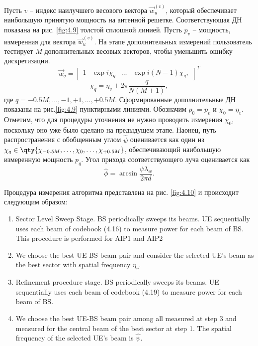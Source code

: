 Пусть $v$ -- индекс наилучшего весового вектора $\vec w_u^{(v)}$, который
обеспечивает наибольшую принятую мощность на антенной решетке.  Соответствующая
ДН показана на рис. \ref{fig:4.9} толстой сплошной линией. Пусть $p_v$ --
мощность, измеренная для вектора $\vec w_u^{(v)}$. На этапе дополнительных измерений
пользователь тестирует $M$ дополнительных весовых векторов, чтобы уменьшить
ошибку дискретизации.
\begin{equation}
    \label{eq:4.19}
    \vec w_q =
    \begin{bmatrix}
        1 & \exp {i \chi_q} & \dots & \exp{i(N-1)\chi_q},
    \end{bmatrix}^T
\end{equation}
\begin{equation}
    \chi_q = \eta_v + 2\pi \frac{q}{N(M+1)},
\end{equation}
где $q=-0.5M,\dots,-1,+1,\dots,+0.5M$. Сформированные дополнительные ДН показаны
на рис.\ref{fig:4.9} пунктирными линиями.  Обозначим $p_0= p_v$ и $\chi_0 =
    \eta_v$. Отметим, что для процедуры уточнения не нужно проводить измерения
$\chi_0$, поскольку оно уже было сделано на предыдущем этапе.  Наонец, путь
распространения с обобщенным углом $\hat \psi$ оценивается как один из $\chi_q
    \in \qty{\chi_{-0.5 M}, \dots, \chi_0, \dots, \chi_{+0.5M}}$, обеспечивающий
наибольшую измеренную мощность $p_q$. Угол прихода соответствующего луча
оценивается как
\begin{equation}
    \hat \phi = \arcsin{\frac{\psi \lambda_w}{2\pi d}}.
\end{equation}

Процедура измерения алгоритма представлена на рис. \ref{fig:4.10} и происходит следующим образом:

\begin{enumerate}
    \item Sector Level Sweep Stage. BS periodically sweeps its beams. UE
          sequentially uses each beam of codebook (4.16) to measure power for each
          beam of BS. This procedure is performed for AIP1 and AIP2
    \item We choose the best UE-BS beam pair and consider the selected UE’s
          beam as the best sector with spatial frequency $\eta_v$.
    \item Refinement procedure stage. BS periodically sweeps its beams. UE
          sequentially uses each beam of codebook (4.19) to measure power for each
          beam of BS.
    \item We choose the best UE-BS beam pair among all measured at step 3 and
          measured for the central beam of the best sector at step 1. The spatial
          frequency of the selected UE’s beam is $\hat \psi$.
\end{enumerate}

